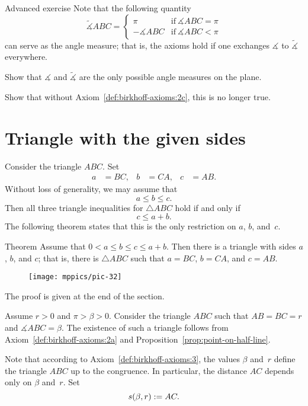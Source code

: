 \begin{thm}{Advanced exercise}\label{ex:angle-measures}
Note that the following quantity 
$$\tilde\measuredangle ABC=
\begin{cases}
\pi&\text{if}\ \measuredangle ABC=\pi
\\
-\measuredangle ABC&\text{if}\ \measuredangle ABC<\pi
\end{cases}
$$
can serve as the angle measure; 
that is, the axioms hold if one exchanges $\measuredangle$ to $\tilde\measuredangle$ everywhere.

Show that $\measuredangle$ and $\tilde\measuredangle$ are the only possible angle measures on the plane. 

Show that without Axiom~\ref{def:birkhoff-axioms:2c}, this is no longer true.
\end{thm}

\section*{Triangle with the given sides}

Consider the triangle $ABC$.
Set 
\begin{align*}
a&=BC,
&
b&=CA,
&
c&=AB.
\end{align*}
Without loss of generality, we may assume that 
\[a\le b \le c.\]
Then all three triangle inequalities for $\triangle ABC$
hold if and only if 
\[c\le a+b.\]
The following theorem states that this is the only restriction on $a$, $b$, and~$c$.

\begin{thm}[\abs]{Theorem}\label{thm:abc}
Assume that $0<a\le b\le c\le a+b$.
Then there is a triangle with sides $a$, $b$, and $c$;
that is, there is $\triangle ABC$ 
such that $a=BC$, $b=CA$, and $c=AB$.
\end{thm}

\begin{wrapfigure}{o}{25mm}
\vskip2mm
\centering
\texttt{[image: mppics/pic-32]}
\end{wrapfigure}

The proof is given at the end of the section.

Assume $r>0$ and $\pi>\beta>0$.
Consider the triangle $ABC$ such that 
$AB=BC=r$ and $\measuredangle ABC=\beta$.
The existence of such a triangle follows from Axiom~\ref{def:birkhoff-axioms:2a} and Proposition~\ref{prop:point-on-half-line}.

Note that according to Axiom~\ref{def:birkhoff-axioms:3}, 
the values
$\beta$ and~$r$ define the triangle $ABC$ up to the congruence.
In particular, the distance $AC$ depends only on $\beta$ and~$r$.
Set 
$$s(\beta,r):= AC.$$

